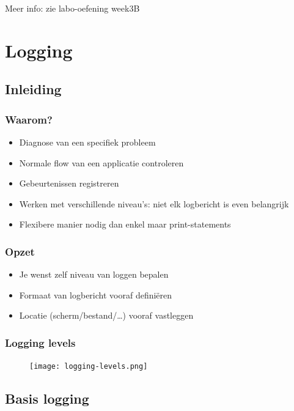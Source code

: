 \documentclass{article}
\begin{document}
Meer info: zie labo-oefening week3B


\section{Logging}

\subsection{Inleiding}

\subsubsection{Waarom?}

\begin{itemize}
    \item Diagnose van een specifiek probleem
    \item Normale flow van een applicatie controleren
    \item Gebeurtenissen registreren
    \item Werken met verschillende niveau's: niet elk logbericht is even belangrijk
    \item Flexibere manier nodig dan enkel maar print-statements
\end{itemize}

\subsubsection{Opzet}

\begin{itemize}
    \item Je wenst zelf niveau van loggen bepalen
    \item Formaat van logbericht vooraf definiëren
    \item Locatie (scherm/bestand/\dots) vooraf vastleggen
\end{itemize}

\subsubsection{Logging levels}

\begin{figure}[H]
    \centering
    \texttt{[image: logging-levels.png]}
\end{figure}

\subsection{Basis logging}
\end{document}
